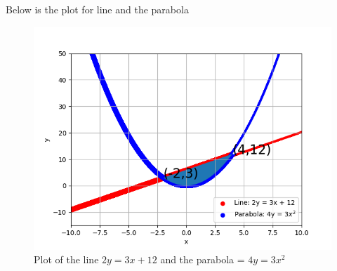 \documentclass[journal]{IEEEtran}
\begin{document}
Below is the plot for line and the parabola
\begin{figure}[h!]
	\centering
	\includegraphics[width=1\columnwidth]{figs/simulated.png}
	\caption{Plot of the line $2y = 3x + 12$ and the parabola = $4y = 3x^2$}
	\label{stemplot}
\end{figure}
\end{document}

